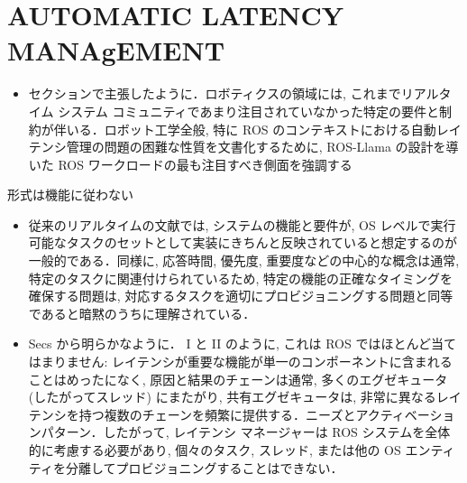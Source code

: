 
\section{AUTOMATIC LATENCY MANAgEMENT}
\label{sec: automatic latency management}

\begin{frame}{}
    \begin{itemize}
        \item セクションで主張したように．ロボティクスの領域には, これまでリアルタイム システム コミュニティであまり注目されていなかった特定の要件と制約が伴いる．ロボット工学全般, 特に ROS のコンテキストにおける自動レイテンシ管理の問題の困難な性質を文書化するために, ROS-Llama の設計を導いた ROS ワークロードの最も注目すべき側面を強調する
    \end{itemize}
\end{frame}

\begin{frame}{形式は機能に従わない}
    \begin{itemize}
        \item 従来のリアルタイムの文献では, システムの機能と要件が, OS レベルで実行可能なタスクのセットとして実装にきちんと反映されていると想定するのが一般的である．同様に, 応答時間, 優先度, 重要度などの中心的な概念は通常, 特定のタスクに関連付けられているため, 特定の機能の正確なタイミングを確保する問題は, 対応するタスクを適切にプロビジョニングする問題と同等であると暗黙のうちに理解されている．
    \end{itemize}
\end{frame}

\begin{frame}{}
    \begin{itemize}
        \item Secs から明らかなように． I と II のように, これは ROS ではほとんど当てはまりません: レイテンシが重要な機能が単一のコンポーネントに含まれることはめったになく, 原因と結果のチェーンは通常, 多くのエグゼキュータ (したがってスレッド) にまたがり, 共有エグゼキュータは, 非常に異なるレイテンシを持つ複数のチェーンを頻繁に提供する．ニーズとアクティベーションパターン．したがって, レイテンシ マネージャーは ROS システムを全体的に考慮する必要があり, 個々のタスク, スレッド, または他の OS エンティティを分離してプロビジョニングすることはできない．
    \end{itemize}
\end{frame}

